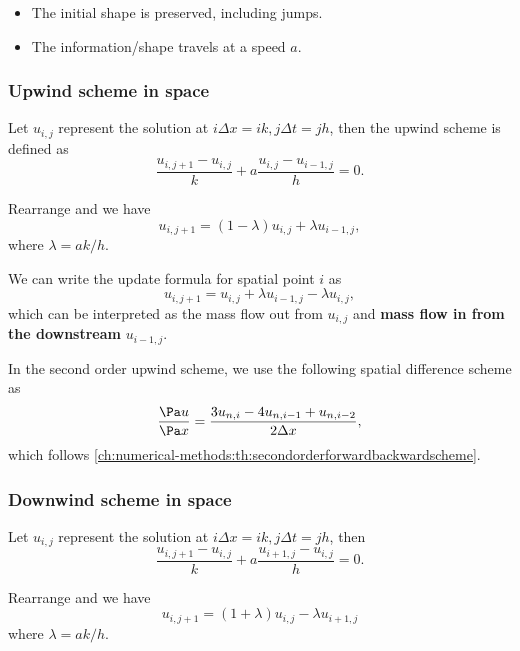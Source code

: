 \begin{refsection}
\begin{remark}\hfill
	\begin{itemize}
		\item The initial shape is preserved, including jumps.
		\item The information/shape travels at a speed $a$.
	\end{itemize}
\end{remark}

\subsubsection{Upwind scheme in space}
\begin{definition}
Let $u_{i,j}$ represent the solution at $i\Delta x =ik, j\Delta t = jh$, then the upwind scheme is defined as
$$\frac{u_{i,j+1} - u_{i,j}}{k} + a \frac{u_{i,j} - u_{i-1,j}}{h} = 0.$$

Rearrange and we have
$$u_{i,j+1} = (1 - \lambda)u_{i,j} + \lambda u_{i-1,j},$$
where $\lambda = ak/h$.
\end{definition}

\begin{remark}
We can write the update formula for spatial point $i$ as
$$u_{i,j+1} = u_{i,j} + \lambda u_{i-1,j} - \lambda u_{i,j},$$
which can be interpreted as the mass flow out from $u_{i,j}$ and \textbf{mass flow in from the downstream} $u_{i-1,j}$.
\end{remark}


\begin{definition}
In the second order upwind scheme, we use the following spatial difference scheme as
$$\frac{\Pa u}{\Pa x} = \frac{3u_{n,i}-4u_{n,i-1}+u_{n,i-2}}{2\Delta x},$$
which follows  \autoref{ch:numerical-methods:th:secondorderforwardbackwardscheme}.	
\end{definition}


\subsubsection{Downwind scheme in space}
\begin{definition}
Let $u_{i,j}$ represent the solution at $i\Delta x =ik, j\Delta t = jh$, then
$$\frac{u_{i,j+1} - u_{i,j}}{k} + a \frac{u_{i+1,j} - u_{i,j}}{h} = 0.$$

Rearrange and we have
$$u_{i,j+1} = (1 + \lambda)u_{i,j} - \lambda u_{i+1,j}$$
where $\lambda = ak/h$.
\end{definition}


\end{refsection}
